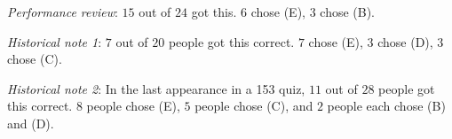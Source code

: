 \documentclass[10pt]{amsart}
\begin{document}
\begin{enumerate}
  {\em Performance review}: $15$ out of $24$ got this. $6$ chose (E),
  $3$ chose (B).

  {\em Historical note 1}: $7$ out of $20$ people got this
  correct. $7$ chose (E), $3$ chose (D), $3$ chose (C).

  {\em Historical note 2}: In the last appearance in a 153 quiz, $11$
  out of $28$ people got this correct. $8$ people chose (E), $5$
  people chose (C), and $2$ people each chose (B) and (D).

\end{enumerate}
\end{document}
